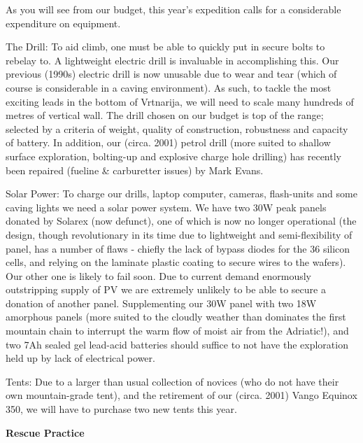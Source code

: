 As you will see from our budget, this year's expedition calls for a considerable expenditure on equipment.

The Drill: To aid climb, one must be able to quickly put in secure bolts to rebelay to. A lightweight electric drill is invaluable in accomplishing this. Our previous (1990s) electric drill is now unusable due to  wear and tear (which of course is considerable in a caving environment). As such, to tackle the most exciting leads in the bottom of Vrtnarija, we will need to scale many hundreds of metres of vertical wall. The drill chosen on our budget is top of the range; selected by a criteria of weight, quality of construction, robustness and capacity of battery. In addition, our (circa. 2001) petrol drill (more suited to shallow surface exploration, bolting-up and explosive charge hole drilling) has recently been repaired (fueline \& carburetter issues) by Mark Evans.

Solar Power: To charge our drills, laptop computer, cameras, flash-units and some caving lights we need a solar power system. We have two 30W peak panels donated by Solarex (now defunct), one of which is now no longer operational (the design, though revolutionary in its time due to lightweight and semi-flexibility of panel, has a number of flaws - chiefly the lack of bypass diodes for the 36 silicon cells, and relying on the laminate plastic coating to secure wires to the wafers). Our other one is likely to fail soon. Due to current demand enormously outstripping supply of PV we are extremely unlikely to be able to secure a donation of another panel. Supplementing our 30W panel with two 18W amorphous panels (more suited to the cloudly weather than dominates the first mountain chain to interrupt the warm flow of moist air from the Adriatic!), and two 7Ah sealed gel lead-acid batteries should suffice to not have the exploration held up by lack of electrical power.

Tents: Due to a larger than usual collection of novices (who do not have their own mountain-grade tent), and the retirement of our (circa. 2001) Vango Equinox 350, we will have to purchase two new tents this year.


\textbf{Rescue Practice}

